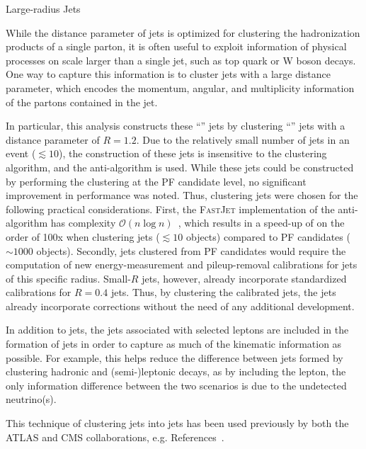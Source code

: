 \begin{section}{Large-radius Jets}

While the distance parameter of \smallR jets is optimized for clustering the hadronization products of a single parton, it is often useful to exploit information of physical processes on scale larger than a single jet, such as top quark or W boson decays.
One way to capture this information is to cluster jets with a large distance parameter, which encodes the momentum, angular, and multiplicity information of the partons contained in the jet.

In particular, this analysis constructs these ``\largeR'' jets by clustering ``\smallR'' jets with a distance parameter of $R = 1.2$.
Due to the relatively small number of \smallR jets in an event ($\lesssim 10$), the construction of these \largeR jets is insensitive to the clustering algorithm, and the anti-\kT algorithm is used.
While these \largeR jets could be constructed by performing the clustering at the PF candidate level, no significant improvement in performance was noted.
Thus, clustering \smallR jets were chosen for the following practical considerations.
First, the \textsc{FastJet} implementation of the anti-\kT algorithm has complexity $\mathcal{O}(n\log n)$~\cite{Cacciari:2005hq}, which results in a speed-up of on the order of 100x when clustering \smallR jets ($\lesssim 10$ objects) compared to PF candidates ($\sim 1000$ objects).
Secondly, \largeR jets clustered from PF candidates would require the computation of new energy-measurement and pileup-removal calibrations for jets of this specific radius.
Small-$R$ jets, however, already incorporate standardized calibrations for $R = 0.4$ jets.
Thus, by clustering the calibrated \smallR jets, the \largeR jets already incorporate corrections without the need of any additional development.

In addition to \smallR jets, the jets associated with selected leptons are included in the formation of \largeR jets in order to capture as much of the kinematic information as possible.
For example, this helps reduce the difference between \largeR jets formed by clustering hadronic and (semi-)leptonic decays, as by including the lepton, the only information difference between the two scenarios is due to the undetected neutrino(s).

This technique of clustering \smallR jets into \largeR jets has been used previously by both the ATLAS and CMS collaborations, e.g. References~\cite{Aaboud:2017aeu,Khachatryan:2016uwr}.


\end{section}
